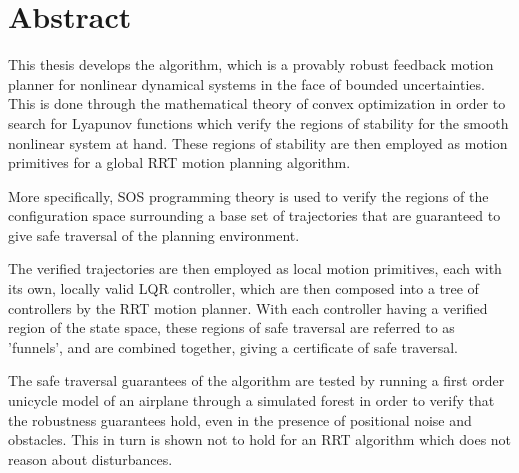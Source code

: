 \chapter*{Abstract}

\abstractintoc{} %
\abstractnum %


This thesis develops the \rrtfunnel{} algorithm, which is a provably robust
feedback motion planner for nonlinear dynamical systems in the face of bounded
uncertainties. This is done through the mathematical theory of convex
optimization in order to search for Lyapunov functions which verify the regions
of stability for the smooth nonlinear system at hand. These regions of stability
are then employed as motion primitives for a global \ac{RRT} motion planning
algorithm.

More specifically, \ac{SOS} programming theory is used to verify the regions of
the configuration space surrounding a base set of trajectories that are
guaranteed to give safe traversal of the planning environment.

The verified trajectories are then employed as local motion primitives, each
with its own, locally valid \ac{LQR} controller, which are then composed into a
tree of controllers by the \ac{RRT} motion planner. With each controller having
a verified region of the state space, these regions of safe traversal are
referred to as 'funnels', and are combined together, giving a certificate of
safe traversal.

The safe traversal guarantees of the algorithm are tested by running a first
order unicycle model of an airplane through a simulated forest in order to
verify that the robustness guarantees hold, even in the presence of positional
noise and obstacles. This in turn is shown not to hold for an \ac{RRT} algorithm
which does not reason about disturbances.

